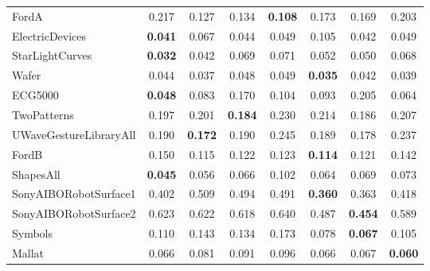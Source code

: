 \documentclass[../../thesis.tex]{subfiles}
\begin{document}
\begin{table}[H]
\begin{adjustbox}{width=\textwidth}
\begin{tabular}{lc|c|c|c|c|c|c}
        \midrule
        FordA                   & 0.217 & 0.127 & 0.134 & \textbf{0.108} & 0.173 & 0.169 & 0.203 \\
        ElectricDevices         & \textbf{0.041} & 0.067 & 0.044 & 0.049 & 0.105 & 0.042 & 0.049 \\
        StarLightCurves         & \textbf{0.032} & 0.042 & 0.069 & 0.071 & 0.052 & 0.050 & 0.068 \\
        Wafer                   & 0.044 & 0.037 & 0.048 & 0.049 & \textbf{0.035} & 0.042 & 0.039 \\
        ECG5000                 & \textbf{0.048} & 0.083 & 0.170 & 0.104 & 0.093 & 0.205 & 0.064 \\
        TwoPatterns             & 0.197 & 0.201 & \textbf{0.184} & 0.230 & 0.214 & 0.186 & 0.207 \\
        UWaveGestureLibraryAll  & 0.190 & \textbf{0.172} & 0.190 & 0.245 & 0.189 & 0.178 & 0.237 \\
        FordB                   & 0.150 & 0.115 & 0.122 & 0.123 & \textbf{0.114} & 0.121 & 0.142 \\
        ShapesAll               & \textbf{0.045} & 0.056 & 0.066 & 0.102 & 0.064 & 0.069 & 0.073 \\
        SonyAIBORobotSurface1   & 0.402 & 0.509 & 0.494 & 0.491 & \textbf{0.360} & 0.363 & 0.418 \\
        SonyAIBORobotSurface2   & 0.623 & 0.622 & 0.618 & 0.640 & 0.487 & \textbf{0.454} & 0.589 \\
        Symbols                 & 0.110 & 0.143 & 0.134 & 0.173 & 0.078 & \textbf{0.067} & 0.105 \\
        Mallat                  & 0.066 & 0.081 & 0.091 & 0.096 & 0.066 & 0.067 & \textbf{0.060} \\
        \bottomrule
    \end{tabular}
    \end{adjustbox}
\end{table}
\end{document}
